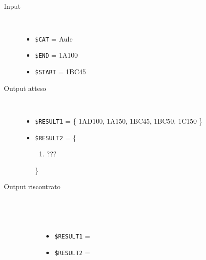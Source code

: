 \documentclass[../../SperimentazioniPratiche.tex]{subfiles}
\begin{document}
			\paragraph*{}
			\label{Prova1D.1}
			\begin{tcolorbox}[fonttitle=\bfseries, 
								adjusted title={\Large Prova 1D.1}, 
								breakable, 
								sharp corners=south,
								colback=white, 
								colframe=white!60!black]
								
				\begin{description}%
				
					\item[Input] \ \par 
        				\begin{itemize}
        					\item \verb|$CAT| = Aule
							\item \verb|$END| = 1A100
							\item \verb|$START| = 1BC45
        				\end{itemize}
        				
        			\tcbline 
        				
        			\item[Output atteso] \ \par
        				\begin{itemize}
        				
        					\item \verb|$RESULT1| = \{
        						1AD100, 1A150, 1BC45, 1BC50, 1C150
        					\}
        				
        					\item \verb|$RESULT2| = \{
        					\begin{enumerate}
        						\item ???
        					\end{enumerate}
        					\}
        					
        				\end{itemize}

					\tcbline				
        				
        			\item[Output riscontrato] \ \par
        				\begin{description}
        				
        					\item[\dispositivoA] \ \par
        					\begin{itemize}
        						\item \verb|$RESULT1| = \ok
        						\item \verb|$RESULT2| = \ok
        					\end{itemize}      					
        					

\end{description}
\end{description}
\end{tcolorbox}
\end{document}
